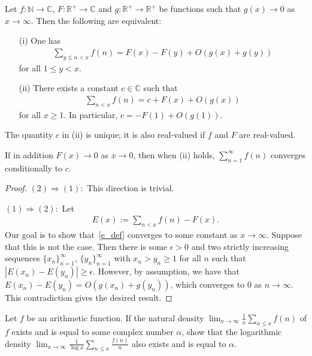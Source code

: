 \documentclass[11pt]{article}
\newenvironment{ex}[1]
  {\renewcommand\theinnercustomthm{#1}\innercustomthm}
  {\endinnercustomthm}
\begin{document}

\begin{ex}{6}\label{six}
Let $f:\mathbb{N}\to\mathbb{C}$, $F:\mathbb{R}^+\to\mathbb{C}$ and $g:\mathbb{R}^+\to\mathbb{R}^+$ be functions such that $g(x)\to 0$ as $x\to\infty$. Then the following are equivalent:
\begin{enumerate}
\item[(i)]One has
\begin{align*}
\sum_{y\leq n<x} f(n) = F(x)-F(y)+O(g(x)+g(y))
\end{align*}
for all $1\leq y<x$.
\item[(ii)] There exists a constant $c\in\mathbb{C}$ such that
\begin{align*}
\sum_{n<x}f(n) = c+F(x)+O(g(x))
\end{align*}
for all $x\geq 1$. In particular, $c=-F(1)+O(g(1))$.
\end{enumerate}
The quantity $c$ in (ii) is unique; it is also real-valued if $f$ and $F$ are real-valued.

If in addition $F(x)\to 0$ as $x\to 0$, then when (ii) holds, $\sum_{n=1}^\infty f(n)$ converges conditionally to $c$.
\end{ex}

\begin{proof}
$(2)\Rightarrow(1):$ This direction is trivial.

$(1)\Rightarrow(2):$ Let
\begin{align}
E(x):= \sum_{n<x} f(n) - F(x).\label{e_def}
\end{align}
Our goal is to show that~\eqref{e_def} converges to some constant as $x\to\infty$. Suppose that this is not the case. Then there is some $\epsilon >0$ and two strictly increasing sequences $\{x_n\}_{n=1}^\infty$, $\{y_n\}_{n=1}^\infty$ with $x_n > y_n\geq 1$ for all $n$ such that $|E(x_n)-E(y_n)| \geq \epsilon$. However, by assumption, we have that $E(x_n)-E(y_n)=O(g(x_n)+g(y_n))$, which converges to 0 as $n\to\infty$. This contradiction gives the desired result.
\end{proof}


\begin{ex}{7}\label{seven}
Let $f$ be an arithmetic function. If the natural density $\lim_{x\to\infty}\frac{1}{x}\sum_{n\leq x}f(n)$ of $f$ exists and is equal to some complex number $\alpha$, show that the logarithmic density $\lim_{x\to\infty}\frac{1}{\log{x}}\sum_{n\leq x}\frac{f(n)}{n}$ also exists and is equal to $\alpha$.
\end{ex}
\end{document}

